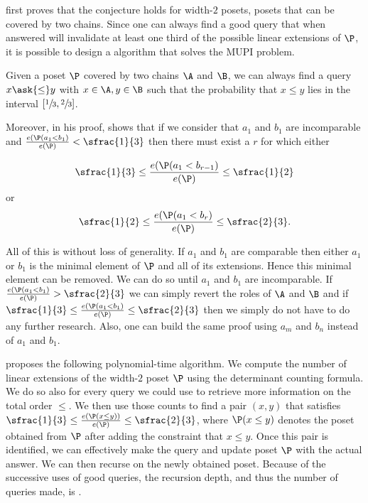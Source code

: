 \citet*{linial:1984} first proves that the \onethirdtwothird conjecture holds
for width-\(2\) posets, \ie posets that can be covered by two chains. Since one
can always find a good query that when answered will invalidate at
least one third of the possible linear extensions of \(\P\), it is possible to design a
 algorithm that solves the MUPI problem.

\begin{theorem}
Given a poset \(\P\) covered by two chains \(\A\) and \(\B\), we can always find
a query \(x \ask{\le} y\) with \(x \in \A, y \in \B\) such that the probability
that \(x \le y\) lies in the interval \([\sfrac{1}{3}, \sfrac{2}{3}]\).
\end{theorem}

Moreover, in his proof, \citet*{linial:1984} shows that if we consider that \(
a_1\) and \(b_1\) are incomparable and \(\frac{e(\P(a_1 < b_1)}{e(\P)} <
\sfrac{1}{3}\) then there must exist a \(r\) for which either

\begin{displaymath}
\sfrac{1}{3} \le \frac{e(\P(a_1 < b_{r-1})}{e(\P)} \le \sfrac{1}{2}
\end{displaymath}
or
\begin{displaymath}
\sfrac{1}{2} \le \frac{e(\P(a_1 < b_{r})}{e(\P)} \le \sfrac{2}{3}.
\end{displaymath}

All of this is without loss of generality. If \(a_1\) and \(b_1\) are
comparable then either \(a_1\) or \(b_1\) is the minimal element of \(\P\) and
all of its extensions. Hence this minimal element can be removed. We can do so
until \(a_1\) and \(b_1\) are incomparable. If \(\frac{e(\P(a_1 < b_1)}{e(\P)} >
\sfrac{2}{3}\) we can simply revert the roles of \(\A\) and \(\B\) and if
\(\sfrac{1}{3} \le \frac{e(\P(a_1 < b_1)}{e(\P)} \le \sfrac{2}{3}\) then we
simply do not have to do any further research. Also, one can build the same
proof using \(a_m\) and \(b_n\) instead of \(a_1\) and \(b_1\).

\citet*{linial:1984} proposes the following polynomial-time algorithm. We
compute the number of linear extensions of the width-\(2\) poset \(\P\) using
the determinant counting formula. We do so also for every query we could use to
retrieve more information on the total order \(\le\). We then use those counts
to find a pair \((x,y)\) that satisfies \(\sfrac{1}{3} \le \frac{e(\P(x \le
y))}{e(\P)} \le \sfrac{2}{3}\), where \(\P(x \le y)\) denotes the poset obtained
from \(\P\) after adding the constraint that \(x \le y\). Once this pair is
identified, we can effectively make the query and update poset \(\P\) with the
actual answer. We can then recurse on the newly obtained poset. Because of the
successive uses of good queries, the recursion depth, and thus the number of
queries made, is .

